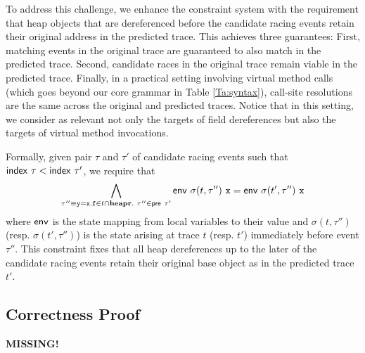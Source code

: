 To address this challenge, we enhance the constraint system with the requirement that heap objects that are dereferenced before the candidate racing events retain their original address in the predicted trace.
This achieves three guarantees: First, matching events in the original trace are guaranteed to also match in the predicted trace. Second, candidate races in the original trace remain viable in the predicted trace. Finally, in a practical setting involving virtual method calls (which goes beyond our core grammar in Table \ref{Ta:syntax}), call-site resolutions are the same across the original and predicted traces. Notice that in this setting, we consider as relevant not only the targets of field dereferences but also the targets of virtual method invocations.

Formally, given pair $\tau$ and $\tau'$ of candidate racing events such that ${\sf index}\ \tau < {\sf index}\ \tau'$, 
we require that
$$
\bigwedge_{\tau'' \equiv {\tt y=x.f} \in t \cap {\bf heapr}.\
	\tau'' \in {\sf pre}\ \tau'} {\sf env}\ \sigma(t,\tau'')\ {\tt x} = {\sf env}\ \sigma(t',\tau'')\ {\tt x}
$$
where ${\sf env}$ is the state mapping from local variables to their value and $\sigma(t,\tau'')$ 
(resp. $\sigma(t',\tau'')$) is the state arising at trace $t$ (resp. $t'$) immediately before event $\tau''$.
This constraint fixes that all heap dereferences up to the later of the candidate racing events retain their original base object as in the predicted trace $t'$. 

\subsection{Correctness Proof}

{\bf MISSING!}